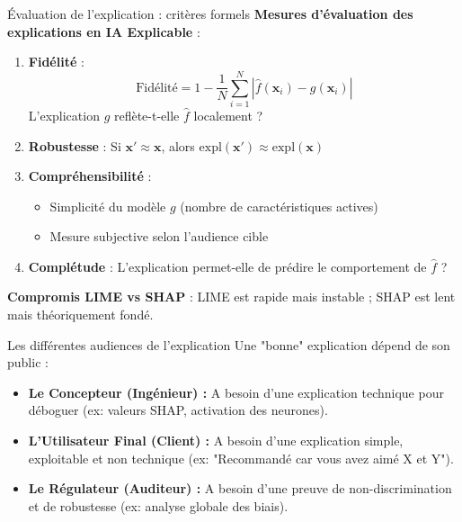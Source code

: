 \documentclass[9pt, aspectratio=169]{beamer}
\begin{document}
\begin{frame}{Évaluation de l'explication : critères formels}
    \textbf{Mesures d'évaluation des explications en IA Explicable} :
    
    \vspace{0.3cm}
    \begin{enumerate}
        \item \textbf{Fidélité} : 
        \[
        \text{Fidélité} = 1 - \frac{1}{N}\sum_{i=1}^{N}|\hat{f}(\mathbf{x}_i) - g(\mathbf{x}_i)|
        \]
        L'explication \(g\) reflète-t-elle \(\hat{f}\) localement ?
        
        \item \textbf{Robustesse} : Si \(\mathbf{x}' \approx \mathbf{x}\), alors \(\text{expl}(\mathbf{x}') \approx \text{expl}(\mathbf{x})\)
        
        \item \textbf{Compréhensibilité} : 
        \begin{itemize}
            \item Simplicité du modèle \(g\) (nombre de caractéristiques actives)
            \item Mesure subjective selon l'audience cible
        \end{itemize}
        
        \item \textbf{Complétude} : L'explication permet-elle de prédire le comportement de \(\hat{f}\) ?
    \end{enumerate}
    
    \vspace{0.2cm}
    \textbf{Compromis LIME vs SHAP} : LIME est rapide mais instable ; SHAP est lent mais théoriquement fondé.
\end{frame}

\begin{frame}{Les différentes audiences de l'explication}
    Une "bonne" explication dépend de son public \parencite{Doran2002What} :
    \begin{itemize}
        \item \textbf{Le Concepteur (Ingénieur) :} A besoin d'une explication technique pour déboguer (ex: valeurs SHAP, activation des neurones).
        \item \textbf{L'Utilisateur Final (Client) :} A besoin d'une explication simple, exploitable et non technique (ex: "Recommandé car vous avez aimé X et Y").
        \item \textbf{Le Régulateur (Auditeur) :} A besoin d'une preuve de non-discrimination et de robustesse (ex: analyse globale des biais).
    \end{itemize}
\end{frame}
\end{document}
